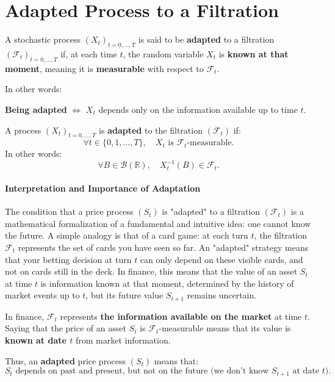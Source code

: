 \section{Adapted Process to a Filtration}

\begin{tcolorbox}[title=General Intuition, colback=green!5!white, colframe=green!50!black]
A stochastic process $(X_t)_{t=0,\dots,T}$ is said to be \textbf{adapted} to a filtration $(\mathcal{F}_t)_{t=0,\dots,T}$ if, at each time $t$, 
the random variable $X_t$ is \textbf{known at that moment}, meaning it is \textbf{measurable} with respect to $\mathcal{F}_t$.

\medskip
In other words:
\begin{center}
\textbf{Being adapted} $\Longleftrightarrow$ $X_t$ depends only on the information available up to time $t$.
\end{center}
\end{tcolorbox}

\begin{definition}
A process $(X_t)_{t=0,\dots,T}$ is \textbf{adapted} to the filtration $(\mathcal{F}_t)$ if:
\[
\forall t \in \{0,1,\dots,T\}, \quad X_t \text{ is } \mathcal{F}_t\text{-measurable.}
\]
In other words:
\[
\forall B \in \mathcal{B}(\mathbb{R}), \quad X_t^{-1}(B) \in \mathcal{F}_t.
\]
\end{definition}

\paragraph*{Interpretation and Importance of Adaptation}
The condition that a price process $(S_t)$ is "adapted" to a filtration $(\mathcal{F}_t)$ is a mathematical formalization of a fundamental and intuitive idea: one cannot know the future. A simple analogy is that of a card game: at each turn $t$, the filtration $\mathcal{F}_t$ represents the set of cards you have seen so far. An "adapted" strategy means that your betting decision at turn $t$ can only depend on these visible cards, and not on cards still in the deck. In finance, this means that the value of an asset $S_t$ at time $t$ is information known at that moment, determined by the history of market events up to $t$, but its future value $S_{t+1}$ remains uncertain.


\begin{example}
In finance, $\mathcal{F}_t$ represents \textbf{the information available on the market} at time $t$.
Saying that the price of an asset $S_t$ is $\mathcal{F}_t$-measurable means that its value is \textbf{known at date $t$}
from market information.

Thus, an \textbf{adapted} price process $(S_t)$ means that:
\[
S_t \text{ depends on past and present, but not on the future (we don't know } S_{t+1} \text{ at date } t).
\]
\end{example}



